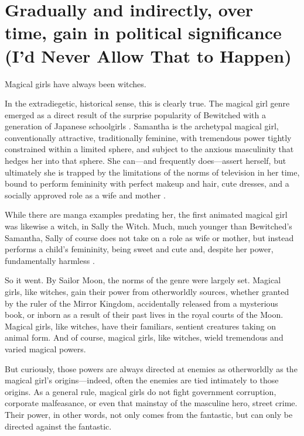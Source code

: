 \chapter{Gradually and indirectly, over time, gain in political significance (I'd Never Allow That to Happen)}
Magical girls have always been witches.

In the extradiegetic, historical sense, this is clearly true. The magical girl genre emerged as a direct result of the surprise popularity of Bewitched with a generation of Japanese schoolgirls \cite{ref59}. Samantha is the archetypal magical girl, conventionally attractive, traditionally feminine, with tremendous power tightly constrained within a limited sphere, and subject to the anxious masculinity that hedges her into that sphere. She can—and frequently does—assert herself, but ultimately she is trapped by the limitations of the norms of television in her time, bound to perform femininity with perfect makeup and hair, cute dresses, and a socially approved role as a wife and mother \cite{ref60}. 

While there are manga examples predating her, the first animated magical girl was likewise a witch, in Sally the Witch. Much, much younger than Bewitched's Samantha, Sally of course does not take on a role as wife or mother, but instead performs a child's femininity, being sweet and cute and, despite her power, fundamentally harmless \cite{ref61}. 

So it went. By Sailor Moon, the norms of the genre were largely set. Magical girls, like witches, gain their power from otherworldly sources, whether granted by the ruler of the Mirror Kingdom, accidentally released from a mysterious book, or inborn as a result of their past lives in the royal courts of the Moon. Magical girls, like witches, have their familiars, sentient creatures taking on animal form. And of course, magical girls, like witches, wield tremendous and varied magical powers.

But curiously, those powers are always directed at enemies as otherworldly as the magical girl's origins—indeed, often the enemies are tied intimately to those origins. As a general rule, magical girls do not fight government corruption, corporate malfeasance, or even that mainstay of the masculine hero, street crime. Their power, in other words, not only comes from the fantastic, but can only be directed against the fantastic.

